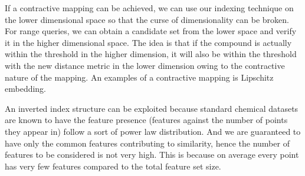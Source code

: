 If a contractive mapping can be achieved, we can use our indexing technique on the lower dimensional space so that the curse of dimensionality can be broken. For range queries, we can obtain a candidate set from the lower space and verify it in the higher dimensional space. The idea is that if the compound is actually within the threshold in the higher dimension, it will also be within the threshold with the new distance metric in the lower dimension owing to the contractive nature of the mapping. An examples of a contractive mapping is Lipschitz embedding.

An inverted index structure can be exploited because standard chemical datasets are known to have the feature presence (features against the number of points they appear in) follow a sort of power law distribution. And we are guaranteed to have only the common features contributing to similarity, hence the number of features to be considered is not very high. This is because on  average every point has very few features compared to the total feature set size.
